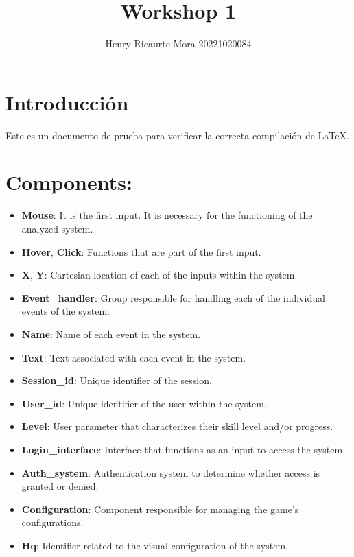 \documentclass{article}
\title{Workshop 1}
\author{Henry Ricaurte Mora 20221020084}
\date{}
\begin{document}
\maketitle

\section{Introducción}
Este es un documento de prueba para verificar la correcta compilación de LaTeX.


\section*{Components: }

\begin{itemize}[leftmargin=*]
    \item \textbf{\textbf{Mouse}}: It is the first input. It is necessary for the functioning of the analyzed system.
    \item \textbf{\textbf{Hover}}, \textbf{\textbf{Click}}: Functions that are part of the first input.
    \item \textbf{\textbf{X}}, \textbf{\textbf{Y}}: Cartesian location of each of the inputs within the system.
    \item \textbf{\textbf{Event\_handler}}: Group responsible for handling each of the individual events of the system.
    \item \textbf{\textbf{Name}}: Name of each event in the system.
    \item \textbf{\textbf{Text}}: Text associated with each event in the system.
    \item \textbf{\textbf{Session\_id}}: Unique identifier of the session.
    \item \textbf{\textbf{User\_id}}: Unique identifier of the user within the system.
    \item \textbf{\textbf{Level}}: User parameter that characterizes their skill level and/or progress.
    \item \textbf{\textbf{Login\_interface}}: Interface that functions as an input to access the system.
    \item \textbf{\textbf{Auth\_system}}: Authentication system to determine whether access is granted or denied.
    \item \textbf{\textbf{Configuration}}: Component responsible for managing the game's configurations.
    \item \textbf{\textbf{Hq}}: Identifier related to the visual configuration of the system.

\end{itemize}
\end{document}
